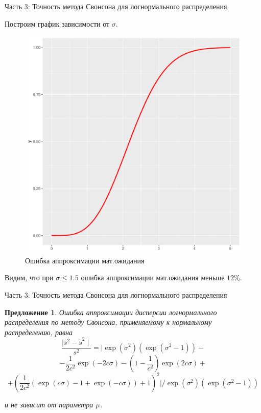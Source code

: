 \documentclass[ucs, notheorems, handout]{beamer}
\newtheorem{proposition2}[theorem]{Предложение}
\begin{document}
\begin{frame}{Часть 3: Точность метода Свонсона для логнормального распределения}
	
	Построим график зависимости от $\sigma$.

	\begin{figure}[h]
		\begin{center}
			\begin{minipage}[h]{0.5\linewidth}
				\includegraphics[width=1\linewidth]{img/m_sig.pdf}
				\caption{Ошибка аппроксимации мат.ожидания} %
				\label{ris:image1} %
			\end{minipage}
			
		\end{center}
	\end{figure}
	
	Видим, что при $\sigma\leq1.5$ ошибка аппроксимации мат.ожидания меньше $12\%$. 
	
\end{frame}

\begin{frame}{Часть 3: Точность метода Свонсона для логнормального распределения}
	\begin{proposition2}\label{pr6}
		Ошибка аппроксимации дисперсии логнормального распределения по методу Свонсона, применяемому к нормальному распределению, равна
		\[\dfrac{\mid s^{2} - \widetilde{s}^{2} \mid}{s^{2}} = \biggl|\exp(\sigma^{2})(\exp(\sigma^{2}-1)) -\]\[- \dfrac{1}{2c^{2}}\exp(-2c\sigma)- \left( 1- \dfrac{1}{c^{2}}\right) \exp(2c\sigma)+\]\[+ \left( \dfrac{1}{2c^{2}}(\exp(c\sigma)-1+\exp(-c\sigma)) + 1\right) ^{2}\biggr| /\exp(\sigma^{2})(\exp(\sigma^{2}-1))\]
		
		
		и не зависит от параметра $\mu $.
	\end{proposition2}
\end{frame}
\end{document}
